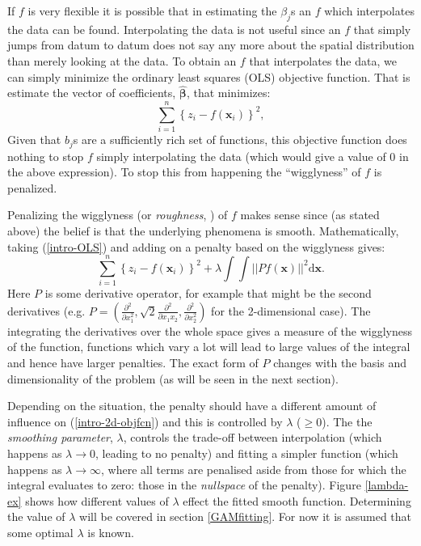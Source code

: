 If $f$ is very flexible it is possible that in estimating the $\beta_j$s an $f$ which interpolates the data can be found. Interpolating the data is not useful since an $f$ that simply jumps from datum to datum does not say any more about the spatial distribution than merely looking at the data. To obtain an $f$ that interpolates the data, we can simply minimize the ordinary least squares (OLS) objective function. That is estimate the vector of coefficients, $\hat{\mathbf{\beta}}$, that minimizes:
\begin{equation}
\sum_{i=1}^n \left \{ z_i - f(\mathbf{x}_i) \right \}^2,
\label{intro-OLS}
\end{equation}
Given that $b_j$s are a sufficiently rich set of functions, this objective function does nothing to stop $f$ simply interpolating the data (which would give a value of 0 in the above expression). To stop this from happening the ``wigglyness'' of $f$ is penalized.

Penalizing the wigglyness (or \textit{roughness}, \cite{rwc}) of $f$ makes sense since (as stated above) the belief is that the underlying phenomena is smooth. Mathematically, taking (\ref{intro-OLS}) and adding on a penalty based on the wigglyness gives:
\begin{equation}
\sum_{i=1}^n \left \{ z_i - f(\mathbf{x}_i) \right \}^2 +  \lambda \int\int \lvert \lvert P f(\mathbf{x}) \rvert \rvert^2 \text{d}\mathbf{x}.
\label{intro-2d-objfcn}
\end{equation}
Here $P$ is some derivative operator, for example that might be the second derivatives (e.g. $P=\left ( \frac{\partial^2}{\partial x_1^2}, \sqrt{2} \frac{\partial^2}{\partial x_1 x_2}, \frac{\partial^2}{\partial x_2^2}\right )$ for the 2-dimensional case). The integrating the derivatives over the whole space gives a measure of the wigglyness of the function, functions which vary a lot will lead to large values of the integral and hence have larger penalties. The exact form of $P$ changes with the basis and dimensionality of the problem (as will be seen in the next section).

Depending on the situation, the penalty should have a different amount of influence on (\ref{intro-2d-objfcn}) and this is controlled by $\lambda$ ($\geq0$). The the \textit{smoothing parameter}, $\lambda$, controls the trade-off between interpolation (which happens as $\lambda \rightarrow 0$, leading to no penalty) and fitting a simpler function (which happens as $\lambda \rightarrow \infty$, where all terms are penalised aside from those for which the integral evaluates to zero: those in the \textit{nullspace} of the penalty). Figure \ref{lambda-ex} shows how different values of $\lambda$ effect the fitted smooth function. Determining the value of $\lambda$ will be covered in section \ref{GAMfitting}. For now it is assumed that some optimal $\lambda$ is known.

